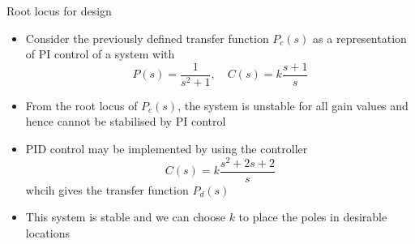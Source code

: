 \documentclass[10pt]{beamer-control}
\begin{document}
\begin{frame}{Root locus for design}
\begin{itemize}
	\item Consider the previously defined transfer function $P_c(s)$ as a representation of PI control of a system with
	\begin{equation}
		P(s)=\frac{1}{s^2+1}, \quad C(s)=k\frac{s+1}{s}
	\end{equation}
	\item From the root locus of $P_c(s)$, the system is unstable for all gain values and hence cannot be stabilised by PI control
	\item PID control may be implemented by using the controller
	\begin{equation}
		C(s)=k\frac{s^2+2s+2}{s}
	\end{equation}
	whcih gives the transfer function $P_d(s)$
	\item This system is stable and we can choose $k$ to place the poles in desirable locations
\end{itemize}
\end{frame}

\SUMMARYFRAME
\FINALE
\end{document}
